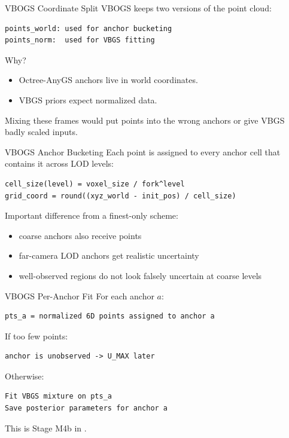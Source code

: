 \documentclass[aspectratio=169]{beamer}
\begin{document}
\begin{frame}[fragile]{VBOGS Coordinate Split}
  VBOGS keeps two versions of the point cloud:

\begin{verbatim}
points_world: used for anchor bucketing
points_norm:  used for VBGS fitting
\end{verbatim}

  Why?

  \begin{itemize}
    \item Octree-AnyGS anchors live in world coordinates.
    \item VBGS priors expect normalized data.
  \end{itemize}

  Mixing these frames would put points into the wrong anchors or give VBGS
  badly scaled inputs.
\end{frame}

\begin{frame}[fragile]{VBOGS Anchor Bucketing}
  Each point is assigned to every anchor cell that contains it across LOD levels:

\begin{verbatim}
cell_size(level) = voxel_size / fork^level
grid_coord = round((xyz_world - init_pos) / cell_size)
\end{verbatim}

  Important difference from a finest-only scheme:

  \begin{itemize}
    \item coarse anchors also receive points
    \item far-camera LOD anchors get realistic uncertainty
    \item well-observed regions do not look falsely uncertain at coarse levels
  \end{itemize}
\end{frame}

\begin{frame}[fragile]{VBOGS Per-Anchor Fit}
  For each anchor \(a\):

\begin{verbatim}
pts_a = normalized 6D points assigned to anchor a
\end{verbatim}

  If too few points:

\begin{verbatim}
anchor is unobserved -> U_MAX later
\end{verbatim}

  Otherwise:

\begin{verbatim}
Fit VBGS mixture on pts_a
Save posterior parameters for anchor a
\end{verbatim}

  This is Stage M4b in .
\end{frame}
\end{document}
